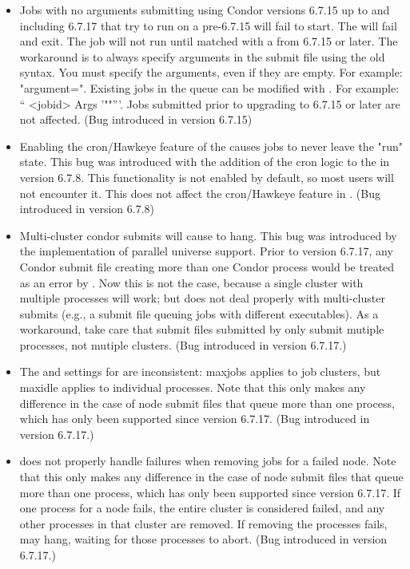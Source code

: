 \begin{itemize}

\item Jobs with no arguments submitting using Condor versions 6.7.15 up to and
including 6.7.17 that try to run on a pre-6.7.15  will fail to
start.  The  will fail and exit.  The job will not run until
matched with a  from 6.7.15 or later.  The workaround is to
always specify arguments in the submit file using the old syntax.  You must
specify the arguments, even if they are empty.  For example: "argument=".
Existing jobs in the queue can be modified with .  For example:
`` <jobid> Args '""'''.  Jobs submitted prior to upgrading to
6.7.15 or later are not affected.
(Bug introduced in version 6.7.15)


\item Enabling the cron/Hawkeye feature of the  causes
jobs to never leave the "run" state.  This bug was introduced with the
addition of the cron logic to the  in version 6.7.8.
This functionality is not enabled by default, so most users will not
encounter it.
This does not affect the cron/Hawkeye feature in .
(Bug introduced in version 6.7.8)

\item Multi-cluster condor submits will cause  to hang.
This bug was introduced by the implementation of parallel universe
support.  Prior to version 6.7.17, any Condor submit file creating
more than one Condor process would be treated as an error by
.  Now this is not the case, because a single cluster
with multiple processes will work; but  does
not deal properly with multi-cluster submits (e.g., a submit file
queuing jobs with different executables).
As a workaround, take care that submit files submitted by 
only submit mutiple processes, not mutiple clusters.
(Bug introduced in version 6.7.17.)

\item The  and  settings for  are
inconsistent: maxjobs applies to job clusters, but maxidle applies
to individual processes.  Note that this only makes any difference
in the case of node submit files that queue more than one process,
which has only been supported since version 6.7.17.
(Bug introduced in version 6.7.17.)

\item {} does not properly handle failures when removing
jobs for a failed node.  Note that this only makes any difference
in the case of node submit files that queue more than one process,
which has only been supported since version 6.7.17.  If one process
for a node fails, the entire cluster is considered failed, and any
other processes in that cluster are removed.  If removing the processes
fails,  may hang, waiting for those processes to abort.
(Bug introduced in version 6.7.17.)

\end{itemize}

